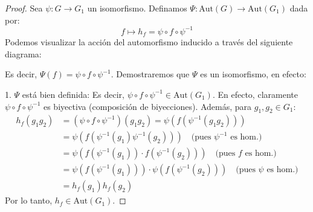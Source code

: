 \begin{proof}
    Sea $\psi: G \to G_1$ un isomorfismo. Definamos $\Psi: \text{Aut}(G) \to \text{Aut}(G_1)$ dada por:
    \begin{equation*}
        f \mapsto h_f = \psi \circ f \circ \psi^{-1}
    \end{equation*}
Podemos visualizar la acción del automorfismo inducido a través del siguiente diagrama:
    \begin{center}
\end{center}

    Es decir, $\Psi(f) = \psi \circ f \circ \psi^{-1}$.
    Demostraremos que $\Psi$ es un isomorfismo, en efecto:

    1. $\Psi$ está bien definida:
    Es decir, $\psi \circ f \circ \psi^{-1} \in \text{Aut}(G_1)$.
    En efecto, claramente $\psi \circ f \circ \psi^{-1}$ es biyectiva (composición de biyecciones). Además, para $g_1, g_2 \in G_1$:
    \begin{align*}
        h_f(g_1 g_2) &= (\psi \circ f \circ \psi^{-1})(g_1 g_2) = \psi(f(\psi^{-1}(g_1 g_2))) \\
        &= \psi(f(\psi^{-1}(g_1)\psi^{-1}(g_2))) \quad \text{(pues } \psi^{-1} \text{ es hom.)} \\
        &= \psi(f(\psi^{-1}(g_1)) \cdot f(\psi^{-1}(g_2))) \quad \text{(pues } f \text{ es hom.)} \\
        &= \psi(f(\psi^{-1}(g_1))) \cdot \psi(f(\psi^{-1}(g_2))) \quad \text{(pues } \psi \text{ es hom.)} \\
        &= h_f(g_1) h_f(g_2)
    \end{align*}
    Por lo tanto, $h_f \in \text{Aut}(G_1)$.


\end{proof}
